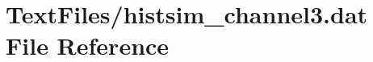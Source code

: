 \hypertarget{TextFiles_2histsim__channel3_8dat}{}\section{Text\+Files/histsim\+\_\+channel3.dat File Reference}
\label{TextFiles_2histsim__channel3_8dat}
